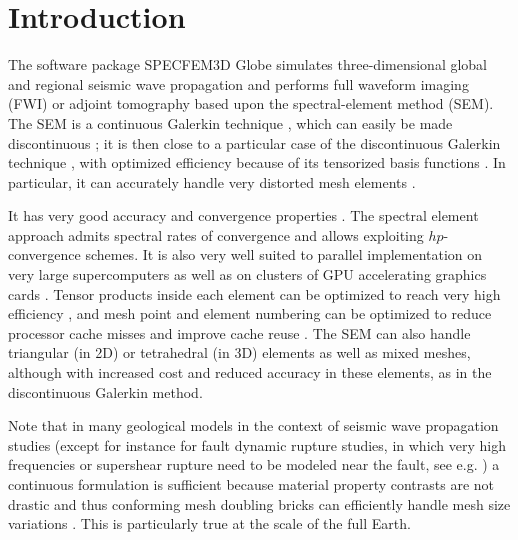 \chapter{Introduction}

The software package SPECFEM3D Globe simulates three-dimensional global and regional seismic wave propagation
and performs full waveform imaging (FWI) or adjoint tomography based upon the spectral-element method (SEM).
The SEM is a continuous Galerkin technique \citep{TrKoLi08,PeKoLuMaLeCaLeMaLiBlNiBaTr11},
which can easily be made discontinuous \citep{BeMaPa94,Ch00,KoWoHu02,ChCaVi03,LaWaBe05,Kop06,WiStBuGh10,AcKo11};
it is then close to a particular case of the discontinuous Galerkin technique \citep{ReHi73,LeRa74,Arn82,JoPi86,BoMaHe91,FaRi99,HuHuRa99,CoKaSh00,GiHeWa02,RiWh03,MoRi05,GrScSc06,AiMoMu06,BeLaPi06,DuKa06,DeSeWh08,PuAmKa09,WiStBuGh10,DeSe10,EtChViGl10}, with optimized efficiency because of its tensorized basis functions \citep{WiStBuGh10,AcKo11}.
In particular, it can accurately handle very distorted mesh elements \citep{OlSe11}.\newline


It has very good accuracy and convergence properties \citep{MaPa89,SePr94,DeFiMu02,Coh02,DeSe07,SeOl08,AiWa09,AiWa10,MeStTh12}.
The spectral element approach admits spectral rates of convergence and allows exploiting $hp$-convergence schemes.
It is also very well suited to parallel implementation on very large supercomputers \citep{KoTsChTr03,TsKoChTr03,KoLaMi08a,CaKoLaTiMiLeSnTr08,KoViCh10} as well as on clusters of GPU accelerating graphics cards \citep{Kom11,MiKo10,KoMiEr09,KoErGoMi10}. Tensor products inside each element can be optimized to reach very high efficiency \citep{DeFiMu02}, and mesh point and element numbering can be optimized to reduce processor cache misses and improve cache reuse \citep{KoLaMi08a}. The SEM can also handle triangular (in 2D) or tetrahedral (in 3D) elements \citep{WinBoyd96,TaWi00,KoMaTrTaWi01,Coh02,MeViSa06} as well as mixed meshes, although with increased cost and reduced accuracy in these elements, as in the discontinuous Galerkin method.\newline


Note that in many geological models in the context of seismic wave propagation studies
(except for instance for fault dynamic rupture studies, in which very high frequencies or supershear rupture need to be modeled near the fault, see e.g. \cite{BeGlCrViPi07,BeGlCrVi09,PuAmKa09,TaCrEtViBeSa10})
a continuous formulation is sufficient because material property contrasts are not drastic and thus
conforming mesh doubling bricks can efficiently handle mesh size variations \citep{KoTr02a,KoLiTrSuStSh04,LeChLiKoHuTr08,LeChKoHuTr09,LeKoHuTr09}.
This is particularly true at the scale of the full Earth.\newline


